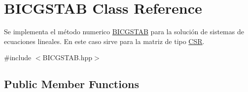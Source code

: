 \hypertarget{class_b_i_c_g_s_t_a_b}{}\section{B\+I\+C\+G\+S\+T\+AB Class Reference}
\label{class_b_i_c_g_s_t_a_b}


Se implementa el método numerico \hyperlink{class_b_i_c_g_s_t_a_b}{B\+I\+C\+G\+S\+T\+AB} para la solución de sistemas de ecuaciones lineales. En este caso sirve para la matriz de tipo \hyperlink{class_c_s_r}{C\+SR}.  




{\ttfamily \#include $<$B\+I\+C\+G\+S\+T\+A\+B.\+hpp$>$}

\subsection*{Public Member Functions}
